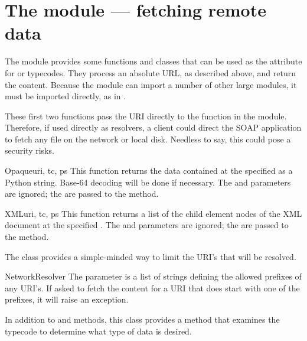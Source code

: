 \chapter{The  module --- fetching remote data}

The  module provides some functions and classes
that can be used as the  attribute for 
or  typecodes.
They process an absolute URL, as described above, and return the
content.
Because the  module can import a number of other
large modules, it must be imported directly, as in
.

These first two functions pass the URI directly to the 
function in the  module.
Therefore, if used directly as resolvers, a client could direct the
SOAP application to fetch any file on the network or local disk.
Needless to say, this could pose a security risks.

\begin{funcdesc}{Opaque}{uri, tc, ps}
This function returns the data contained at the specified 
as a Python string.
Base-64 decoding will be done if necessary.
The  and  parameters are ignored; the 
are passed to the  method.
\end{funcdesc}

\begin{funcdesc}{XML}{uri, tc, ps}
This function returns a list of the child element nodes of the XML
document at the specified .
The  and  parameters are ignored; the 
are passed to the  method.
\end{funcdesc}

The  class provides a simple-minded way to limit
the URI's that will be resolved.

\begin{classdesc}{NetworkResolver}{}
The  parameter is a list of strings defining the allowed
prefixes of any URI's.
If asked to fetch the content for a URI that does start with one of
the prefixes, it will raise an exception.

In addition to  and  methods, this class
provides a  method that examines the typecode to determine
what type of data is desired.
\end{classdesc}

